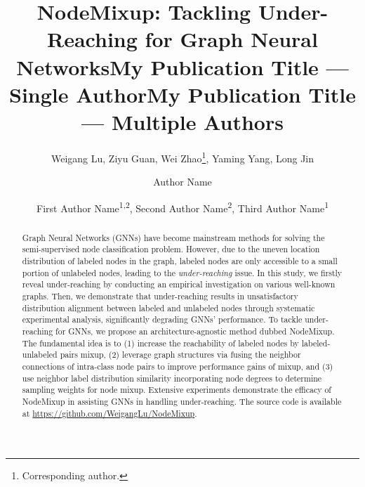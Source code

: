 \documentclass[letterpaper]{article} %
\title{NodeMixup: Tackling Under-Reaching for Graph Neural Networks}
\author{
    Weigang Lu,
    Ziyu Guan,
    Wei Zhao\thanks{Corresponding author.},
    Yaming Yang,
    Long Jin
}
\title{My Publication Title --- Single Author}
\author {
    Author Name
}
\title{My Publication Title --- Multiple Authors}
\author {
    First Author Name\textsuperscript{\rm 1,\rm 2},
    Second Author Name\textsuperscript{\rm 2},
    Third Author Name\textsuperscript{\rm 1}
}
\begin{document}
\maketitle

\begin{abstract}
Graph Neural Networks (GNNs) have become mainstream methods for solving the semi-supervised node classification problem. However, due to the uneven location distribution of labeled nodes in the graph, labeled nodes are only accessible to a small portion of unlabeled nodes, leading to the \emph{under-reaching} issue. In this study, we firstly reveal under-reaching by conducting an empirical investigation on various well-known graphs. Then, we demonstrate that under-reaching results in unsatisfactory distribution alignment between labeled and unlabeled nodes through systematic experimental analysis, significantly degrading GNNs' performance. To tackle under-reaching for GNNs, we propose an architecture-agnostic method dubbed NodeMixup. The fundamental idea is to (1) increase the reachability of labeled nodes by labeled-unlabeled pairs mixup, (2) leverage graph structures via fusing the neighbor connections of intra-class node pairs to improve performance gains of mixup, and (3) use neighbor label distribution similarity incorporating node degrees to determine sampling weights for node mixup. Extensive experiments demonstrate the efficacy of NodeMixup in assisting GNNs in handling under-reaching. The source code is available at \url{https://github.com/WeigangLu/NodeMixup}.

\end{abstract}
\end{document}
